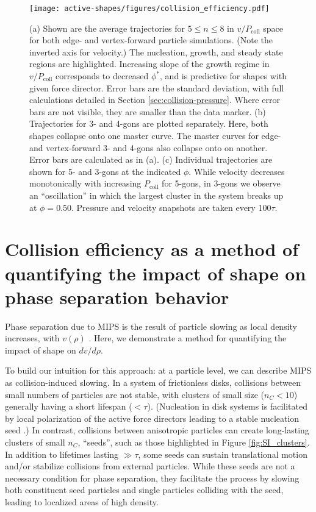\begin{figure*}[t]
\begin{center}
\texttt{[image: active-shapes/figures/collision\_efficiency.pdf]}
\caption{
(a)
Shown are the average trajectories for $5{\leq}n{\leq}8$ in $v/P_\text{coll}$ space for both edge- and vertex-forward particle simulations.
(Note the inverted axis for velocity.)
The nucleation, growth, and steady state regions are highlighted.
Increasing slope of the growth regime in $v/P_\text{coll}$ corresponds to decreased $\phi^*$, and is predictive for shapes with given force director.
Error bars are the standard deviation, with full calculations detailed in Section \ref{sec:collision-pressure}.
Where error bars are not visible, they are smaller than the data marker.
(b)
Trajectories for 3- and 4-gons are plotted separately.
Here, both shapes collapse onto one master curve.
The master curves for edge- and vertex-forward 3- and 4-gons also collapse onto on another.
Error bars are calculated as in (a).
(c)
Individual trajectories are shown for 5- and 3-gons at the indicated $\phi$.
While velocity decreases monotonically with increasing $P_\text{coll}$ for 5-gons, in 3-gons we observe an ``oscillation'' in which the largest cluster in the system breaks up at $\phi=0.50$.
Pressure and velocity snapshots are taken every 100$\tau$.
}
\label{fig:pressure}
\end{center}
\end{figure*}

\section{Collision efficiency as a method of quantifying the impact of shape on phase separation behavior}
\label{sec:collision_efficiency}

Phase separation due to MIPS is the result of particle slowing as local density increases, with $v(\rho)$ \cite{Cates_2013_EPL}.
Here, we demonstrate a method for quantifying the impact of shape on ${dv}/{d\rho}$.

To build our intuition for this approach: at a particle level, we can describe MIPS as collision-induced slowing.
In a system of frictionless disks, collisions between small numbers of particles are not stable, with clusters of small size ($n_C<10$) generally having a short lifespan ($<\tau$).
(Nucleation in disk systems is facilitated by local polarization of the active force directors leading to a stable nucleation seed \cite{Redner_2016_PRL,Richard_2016_SoftMatter}.)
In contrast, collisions between anisotropic particles can create long-lasting clusters of small $n_C$, ``seeds'', such as those highlighted in Figure \ref{fig:SI_clusters}.
In addition to lifetimes lasting $\gg\tau$, some seeds can sustain translational motion and/or stabilize collisions from external particles.
While these seeds are not a necessary condition for phase separation, they facilitate the process by slowing both constituent seed particles and single particles colliding with the seed, leading to localized areas of high density.

